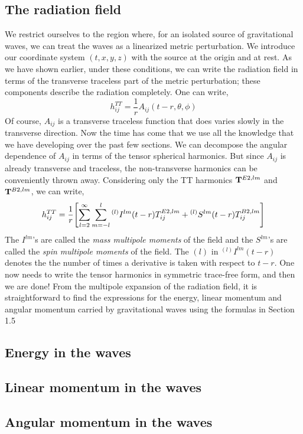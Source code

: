 \documentclass[a4paper,11pt]{article}
\begin{document}
\subsection{The radiation field}
We restrict ourselves to the region where, for an isolated source of gravitational waves, we can treat the waves as a linearized metric perturbation. We introduce our coordinate system $ (t,x,y,z) $ with the source at the origin and at rest. As we have shown earlier, under these conditions, we can write the radiation field in terms of the transverse traceless part of the metric perturbation; these components describe the radiation completely. One can write,
\begin{equation*}
h^{TT}_{ij} = \dfrac{1}{r} A_{ij}(t-r,\theta, \phi	)
\end{equation*}
Of course, $ A_{ij} $ is a transverse traceless function that does varies slowly in the transverse direction. Now the time has come that we use all the knowledge that we have developing over the past few sections. We can decompose the angular dependence of  $ A_{ij} $ in terms of the tensor spherical harmonics. But since $ A_{ij} $ is already transverse and traceless, the non-transverse harmonics can be conveniently thrown away. Considering only the TT harmonics $ \vb{T}^{E2, lm} $ and $ \vb{T}^{B2,lm} $, we can write,
\begin{equation*}
h^{TT}_{ij} = \dfrac{1}{r}\qty[\sum_{l=2}^{\infty} \sum_{m=-l}^{l} {}^{(l)} I^{lm}(t-r){T}^{E2, lm}_{ij} + {}^{(l)} S^{lm}(t-r){T}^{B2, lm}_{ij}]
\end{equation*}
The $ I^{lm} $'s are called the \textit{mass multipole moments} of the field and the $ S^{lm} $'s are called the \textit{spin multipole moments} of the field. The $ (l) $ in $ {}^{(l)}I^{lm}(t-r) $ denotes the the number of times a derivative is taken with respect to $ t-r $. One now needs to write the tensor harmonics in symmetric trace-free form, and then we are done! From the multipole expansion of the radiation field, it is straightforward to find the expressions for the energy, linear momentum and angular momentum carried by gravitational waves using the formulas in Section 1.5

\subsection{Energy in the waves}

\subsection{Linear momentum in the waves}

\subsection{Angular momentum in the waves}
\end{document}
